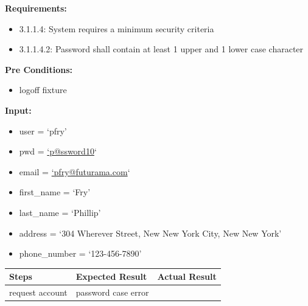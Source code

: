 \documentclass[letterpaper,10pt,english]{sphinxmanual}
\begin{document}
\begin{fulllineitems}
\label{STD/test_password:test_password.test_password_case}
\textbf{Requirements:}
\begin{itemize}
\item {} 
3.1.1.4: System requires a minimum security criteria

\item {} 
3.1.1.4.2: Password shall contain at least 1 upper and 1 lower case character

\end{itemize}

\textbf{Pre Conditions:}
\begin{itemize}
\item {} 
logoff fixture

\end{itemize}

\textbf{Input:}
\begin{itemize}
\item {} 
user = `pfry'

\item {} 
pwd = \href{mailto:'p@ssword10}{`p@ssword10}`

\item {} 
email = \href{mailto:'pfry@futurama.com}{`pfry@futurama.com}`

\item {} 
first\_name = `Fry'

\item {} 
last\_name = `Phillip'

\item {} 
address = `304 Wherever Street, New New York City, New New York'

\item {} 
phone\_number = `123-456-7890'

\end{itemize}

\begin{tabulary}{\linewidth}{|L|L|L|}
\hline
\textsf{\relax 
Steps
} & \textsf{\relax 
Expected Result
} & \textsf{\relax 
Actual Result
}\\
\hline
request account
 & 
password case error
 & \\
\hline\end{tabulary}


\end{fulllineitems}

\end{document}
